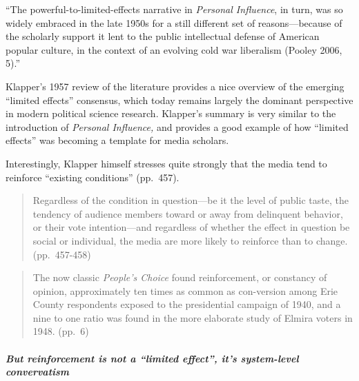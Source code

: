 \documentclass[12pt,book]{article}
\begin{document}
``The powerful-to-limited-effects narrative in \emph{Personal
Influence}, in turn, was so widely embraced in the late 1950s for a
still different set of reasons---because of the scholarly support it
lent to the public intellectual defense of American popular culture, in
the context of an evolving cold war liberalism (Pooley 2006, 5).''

Klapper's 1957 review of the literature provides a nice overview of the
emerging ``limited effects'' consensus, which today remains largely the
dominant perspective in modern political science research. Klapper's
summary is very similar to the introduction of \emph{Personal
Influence,} and provides a good example of how ``limited effects'' was
becoming a template for media scholars.

Interestingly, Klapper himself stresses quite strongly that the media
tend to reinforce ``existing conditions'' (pp.~457).

\begin{quote}
Regardless of the condition in question---be it the level of public
taste, the tendency of audience members toward or away from delinquent
behavior, or their vote intention---and regardless of whether the effect
in question be social or individual, the media are more likely to
reinforce than to change. (pp.~457-458)
\end{quote}

\begin{quote}
The now classic \emph{People's Choice} found reinforcement, or constancy
of opinion, approximately ten times as common as con-version among Erie
County respondents exposed to the presidential campaign of 1940, and a
nine to one ratio was found in the more elaborate study of Elmira voters
in 1948. (pp.~6)
\end{quote}

\subparagraph{But reinforcement is not a ``limited effect'', it's
system-level
convervatism}\label{but-reinforcement-is-not-a-limited-effect-its-system-level-convervatism}
\end{document}
